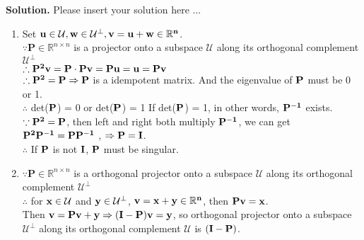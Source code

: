 \documentclass[english,onecolumn]{IEEEtran}
\newcommand{\Rbb}{\mathbb{R}}
\newcommand{\Pb}{\mathbf{P}}
\begin{document}
\noindent
\textbf{Solution.}
Please insert your solution here ... 
\begin{enumerate}
    \item
    Set $ \bf{u} \in \mathcal{U}, \bf{w} \in \mathcal{U}^{\perp}, \bf{v = u + w} \in \mathbb{R}^n$.\\
    $\because \Pb\in \Rbb^{n\times n}$ is a projector onto a subspace $\mathcal{U}$ along its orthogonal complement $\mathcal{U}^{\perp}$\\
    $\therefore \bf{P^2 v= P \cdot P v = P u = u = P v }  $ \\ 
    $\therefore \bf{P^2 = P} \Rightarrow \bf{P} $ is a idempotent matrix. And the eigenvalue of $\bf{P}$ must be 0 or 1.\\
    $\therefore $  det($\bf{P}$) = 0 or det($\bf{P}$) = 1
    If det($\bf{P}$) = 1, in other words, $\bf{P^{-1}}$ exists.\\
    $\because \bf{P^2 = P}$, then left and right both multiply $\bf{P^{-1}}$, we can get $\bf{P^{2} P^{-1} = P P^{-1}}$ , $ \Rightarrow \bf{P = I}$.\\
    $\therefore$ If $\bf{P} $ is not $\bf{I}$, $\bf{P}$ must be singular.\\
    
    \item
    $\because \Pb\in \Rbb^{n\times n}$ is a orthogonal projector onto a subspace $\mathcal{U}$ along its orthogonal complement $\mathcal{U}^{\perp}$\\
    $\therefore$ for $\bf{x} \in \mathcal{U}$ and $\bf{y} \in \mathcal{U}^{\perp}$, $\bf{v = x + y} \in \mathbb{R}^n$, then $\bf{P v = x}$.\\
    Then $\bf{v = P v + y } \Rightarrow \bf{(I-P)v = y}$, so orthogonal projector onto a subspace $\mathcal{U}^{\perp}$ along its orthogonal complement $\mathcal{U}$ is $\bf{(I-P)}$.    \\
    

\end{enumerate}
\end{document}
